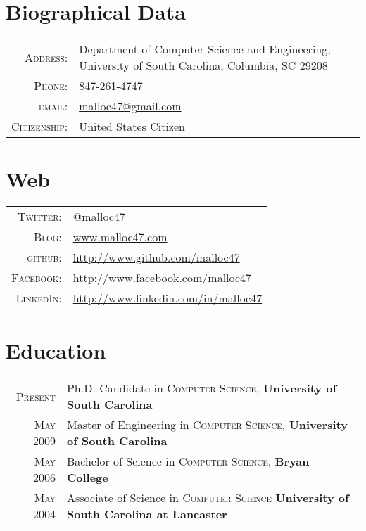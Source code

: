 \documentclass[a4paper,10pt]{article}
\begin{document}
\pagestyle{empty}
\par{\bigskip\par}

\section{Biographical Data}

\begin{tabular}{r p{12cm}}
  \textsc{Address:}	& Department of Computer Science and Engineering, University of South Carolina, Columbia, SC 29208 \\
  \textsc{Phone:}       & 847-261-4747\\
  \textsc{email:}       & \href{mailto:malloc47@gmail.com}{malloc47@gmail.com} \\
  \textsc{Citizenship:} & United States Citizen \\
\end{tabular}

\section{Web}
\begin{tabular}{r p{12cm}}
  \textsc{Twitter:}     & @malloc47 \\
  \textsc{Blog:}	& \href{http://www.malloc47.com}{www.malloc47.com} \\
  \textsc{github:}      & \href{http://www.github.com/malloc47}{http://www.github.com/malloc47}\\
  \textsc{Facebook:}    & \href{http://www.facebook.com/malloc47}{http://www.facebook.com/malloc47} \\
  \textsc{LinkedIn:}       & \href{http://www.linkedin.com/in/malloc47}{http://www.linkedin.com/in/malloc47} \\
\end{tabular}

\section{Education}
\begin{tabular}{r p{13.5cm}}	
  \textsc{Present} & Ph.D. Candidate in \textsc{Computer Science}, \textbf{University of South Carolina}\\
  \textsc{May} 2009 & Master of Engineering in \textsc{Computer Science}, \textbf{University of South Carolina}\\
  \textsc{May} 2006& Bachelor of Science in \textsc{Computer Science}, \textbf{Bryan College} \\
\textsc{May} 2004& Associate of Science in \textsc{Computer Science} \textbf{University of South Carolina at Lancaster} \\
\end{tabular}
\end{document}

